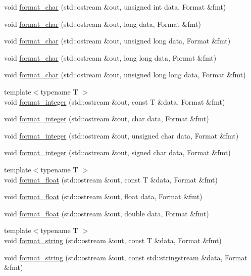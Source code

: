 \begin{DoxyCompactItemize}
\item 
void \hyperlink{namespacecp_a7cb425445512ed4efca5c3becf5c4d31}{format\_\-char} (std::ostream \&out, unsigned int data, Format \&fmt)
\item 
void \hyperlink{namespacecp_a54389ebf91bc95580ab42b9bd57e9fc9}{format\_\-char} (std::ostream \&out, long data, Format \&fmt)
\item 
void \hyperlink{namespacecp_a21ae8cc02481a788f7e3072f23eacbd2}{format\_\-char} (std::ostream \&out, unsigned long data, Format \&fmt)
\item 
void \hyperlink{namespacecp_a7511f1c332986a17854f42421d4362c5}{format\_\-char} (std::ostream \&out, long long data, Format \&fmt)
\item 
void \hyperlink{namespacecp_ae70d3faeee016080d264d2693275f008}{format\_\-char} (std::ostream \&out, unsigned long long data, Format \&fmt)
\item 
{\footnotesize template$<$typename T $>$ }\\void \hyperlink{namespacecp_a0ec2cefdf66b27770aa1282096ec027f}{format\_\-integer} (std::ostream \&out, const T \&data, Format \&fmt)
\item 
void \hyperlink{namespacecp_abdef834401138d6ef18eef43c4f889b8}{format\_\-integer} (std::ostream \&out, char data, Format \&fmt)
\item 
void \hyperlink{namespacecp_adbaf7e97e476a81d8f558dba458de4e4}{format\_\-integer} (std::ostream \&out, unsigned char data, Format \&fmt)
\item 
void \hyperlink{namespacecp_a0c00898edd5c59413de79d1e79afc0d2}{format\_\-integer} (std::ostream \&out, signed char data, Format \&fmt)
\item 
{\footnotesize template$<$typename T $>$ }\\void \hyperlink{namespacecp_a63b4184f62502d169eea5a4d2d66ebba}{format\_\-float} (std::ostream \&out, const T \&data, Format \&fmt)
\item 
void \hyperlink{namespacecp_aa97e39eb705c0bce5b4d1bb37d62a184}{format\_\-float} (std::ostream \&out, float data, Format \&fmt)
\item 
void \hyperlink{namespacecp_a5e15926263e49c0f424851264822744f}{format\_\-float} (std::ostream \&out, double data, Format \&fmt)
\item 
{\footnotesize template$<$typename T $>$ }\\void \hyperlink{namespacecp_a302829141f210fff0ccc4f6c5a5d78fd}{format\_\-string} (std::ostream \&out, const T \&data, Format \&fmt)
\item 
void \hyperlink{namespacecp_a5faf6112477905a24772474cd93f884c}{format\_\-string} (std::ostream \&out, const std::stringstream \&data, Format \&fmt)
\end{DoxyCompactItemize}
